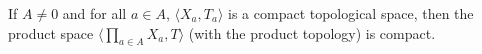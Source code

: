 If $A \neq 0$ and for all $a \in A$, $\langle X_a, T_a \rangle$ is a compact topological space, then the product space $\langle \prod_{a \in A} X_a, T \rangle$ (with the product topology) is compact.
